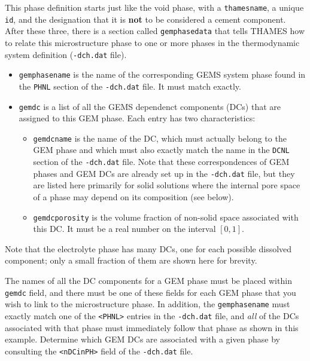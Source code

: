 \documentclass{article}
\newcommand{\us}{\underline{\phantom{X}}}
\begin{document}
{\normalsize{ }
This phase definition starts just like the void phase, with a
\verb!thamesname!, a unique \verb!id!, and the designation
that it is \textbf{not} to be considered a cement component.
After these three, there is a section called \texttt{gemphase{\us}data}
that tells THAMES how
to relate this microstructure phase to one or more phases in
the thermodynamic system definition (\verb!-dch.dat! file).
\begin{itemize}
	\item \verb!gemphasename! is the name of the corresponding
	      GEMS system phase found in the \verb!PHNL! section of the
	      \verb!-dch.dat! file. It must match exactly.
	\item \verb!gemdc! is a list of all the GEMS dependenct
	      components (DCs) that are assigned to this GEM phase.
	      Each entry has two characteristics:
	      \begin{itemize}
		      \item \verb!gemdcname! is the name of the DC, which must
		            actually belong to the GEM phase and which must also
		            exactly match the name in the \verb!DCNL! section of
		            the \verb!-dch.dat! file. Note that these correspondences
		            of GEM phases and GEM DCs are already set up in the
		            \verb!-dch.dat! file, but they are listed here primarily
		            for solid solutions where the internal pore space of
		            a phase may depend on its composition (see below).
		      \item \verb!gemdcporosity! is the volume fraction of
		            non-solid space associated with this DC. It must be a
		            real number on the interval $\left[0,1\right]$.
	      \end{itemize}
\end{itemize}
Note that the electrolyte phase has many DCs, one for each
possible dissolved component; only a small fraction of them are
shown here for brevity.

The names of all
the DC components for a GEM phase must be placed within \verb!gemdc! field,
and there must be one of these fields for each GEM phase that you wish to link
to the microstructure phase.  In addition, the \verb!gemphasename! must exactly match
one of the \verb!<PHNL>! entries in the \verb!-dch.dat! file, and
\textit{all} of the DCs associated with that phase must immediately follow that
phase as shown in this example.  Determine which GEM DCs are associated
with a given phase by consulting the \verb!<nDCinPH>! field of the \verb!-dch.dat! file.

}
\end{document}
